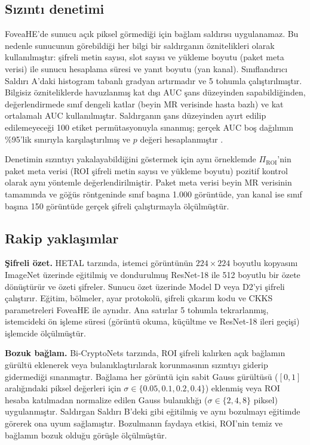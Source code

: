 \subsection{Sızıntı denetimi}\label{sec:fov:leakage}

FoveaHE'de sunucu açık piksel görmediği için bağlam saldırısı uygulanamaz. Bu nedenle sunucunun görebildiği her bilgi bir saldırganın öznitelikleri olarak kullanılmıştır: şifreli metin sayısı, slot sayısı ve yükleme boyutu (paket meta verisi) ile sunucu hesaplama süresi ve yanıt boyutu (yan kanal). Sınıflandırıcı Saldırı A'daki histogram tabanlı gradyan artırmadır ve 5 tohumla çalıştırılmıştır. Bilgisiz özniteliklerde havuzlanmış kat dışı AUC şans düzeyinden sapabildiğinden, değerlendirmede sınıf dengeli katlar (beyin MR verisinde hasta bazlı) ve kat ortalamalı AUC kullanılmıştır. Saldırganın şans düzeyinden ayırt edilip edilemeyeceği 100 etiket permütasyonuyla sınanmış; gerçek AUC boş dağılımın \%95'lik sınırıyla karşılaştırılmış ve $p$ değeri hesaplanmıştır \cite{ojala2010permutation}.

Denetimin sızıntıyı yakalayabildiğini göstermek için aynı örneklemde $\Pi_{\mathrm{ROI}}$'nin paket meta verisi (ROI şifreli metin sayısı ve yükleme boyutu) pozitif kontrol olarak aynı yöntemle değerlendirilmiştir. Paket meta verisi beyin MR verisinin tamamında ve göğüs röntgeninde sınıf başına 1.000 görüntüde, yan kanal ise sınıf başına 150 görüntüde gerçek şifreli çalıştırmayla ölçülmüştür.

\subsection{Rakip yaklaşımlar}\label{sec:fov:rivals}

\textbf{Şifreli özet.} HETAL \cite{lee2023hetal} tarzında, istemci görüntünün $224 \times 224$ boyutlu kopyasını ImageNet \cite{deng2009imagenet} üzerinde eğitilmiş ve dondurulmuş ResNet-18 \cite{he2016resnet} ile 512 boyutlu bir özete dönüştürür ve özeti şifreler. Sunucu özet üzerinde Model D veya D2'yi şifreli çalıştırır. Eğitim, bölmeler, ayar protokolü, şifreli çıkarım kodu ve CKKS parametreleri FoveaHE ile aynıdır. Ana satırlar 5 tohumla tekrarlanmış, istemcideki ön işleme süresi (görüntü okuma, küçültme ve ResNet-18 ileri geçişi) işlemcide ölçülmüştür.

\textbf{Bozuk bağlam.} Bi-CryptoNets \cite{yuan2024bicryptonets} tarzında, ROI şifreli kalırken açık bağlamın gürültü eklenerek veya bulanıklaştırılarak korunmasının sızıntıyı giderip gidermediği sınanmıştır. Bağlama her görüntü için sabit Gauss gürültüsü ($[0, 1]$ aralığındaki piksel değerleri için $\sigma \in \{0.05, 0.1, 0.2, 0.4\}$) eklenmiş veya ROI hesaba katılmadan normalize edilen Gauss bulanıklığı ($\sigma \in \{2, 4, 8\}$ piksel) uygulanmıştır. Saldırgan Saldırı B'deki gibi eğitilmiş ve aynı bozulmayı eğitimde görerek ona uyum sağlamıştır. Bozulmanın faydaya etkisi, ROI'nin temiz ve bağlamın bozuk olduğu görüşle ölçülmüştür.

